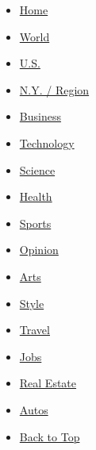 \begin{itemize}
\tightlist
\item
  \href{//www.nytimes3xbfgragh.onion}{Home}
\item
  \href{//www.nytimes3xbfgragh.onion/pages/world/index.html}{World}
\item
  \href{//www.nytimes3xbfgragh.onion/pages/national/index.html}{U.S.}
\item
  \href{//www.nytimes3xbfgragh.onion/pages/nyregion/index.html}{N.Y. /
  Region}
\item
  \href{//www.nytimes3xbfgragh.onion/pages/business/index.html}{Business}
\item
  \href{//www.nytimes3xbfgragh.onion/pages/technology/index.html}{Technology}
\item
  \href{//www.nytimes3xbfgragh.onion/pages/science/index.html}{Science}
\item
  \href{//www.nytimes3xbfgragh.onion/pages/health/index.html}{Health}
\item
  \href{//www.nytimes3xbfgragh.onion/pages/sports/index.html}{Sports}
\item
  \href{//www.nytimes3xbfgragh.onion/pages/opinion/index.html}{Opinion}
\item
  \href{//www.nytimes3xbfgragh.onion/pages/arts/index.html}{Arts}
\item
  \href{//www.nytimes3xbfgragh.onion/pages/style/index.html}{Style}
\item
  \href{//www.nytimes3xbfgragh.onion/pages/travel/index.html}{Travel}
\item
  \href{//www.nytimes3xbfgragh.onion/pages/jobs/index.html}{Jobs}
\item
  \href{//www.nytimes3xbfgragh.onion/pages/realestate/index.html}{Real
  Estate}
\item
  \href{//www.nytimes3xbfgragh.onion/pages/automobiles/index.html}{Autos}
\item
  \protect\hyperlink{top}{Back to Top}
\end{itemize}

